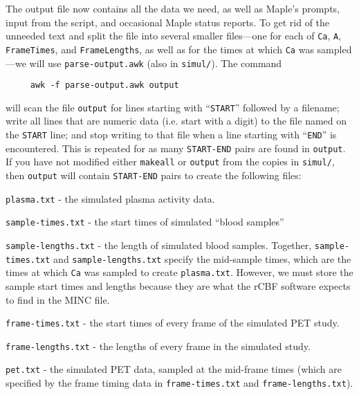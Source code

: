 The output file now contains all the data we need, as well as Maple's
prompts, input from the script, and occasional Maple status reports.
To get rid of the unneeded text and split the file into several
smaller files---one for each of \verb|Ca|, \verb|A|, \verb|FrameTimes|,
and \verb|FrameLengths|, as well as for the times at which \verb|Ca|
was sampled---we will use \verb|parse-output.awk| (also in
\verb|simul/|).  The command
\begin{verbatim}
     awk -f parse-output.awk output
\end{verbatim}
will scan the file \verb|output| for lines starting with
``\verb|START|'' followed by a filename; write all lines that are
numeric data (i.e. start with a digit) to the file named on the
\verb|START| line; and stop writing to that file when a line starting
with ``\verb|END|'' is encountered.  This is repeated for as many
\verb|START-END| pairs are found in \verb|output|.  If you have not
modified either \verb|makeall| or \verb|output| from the copies in
\verb|simul/|, then \verb|output| will contain
\verb|START-END| pairs to create the following files:
\begin{description}
\item \verb|plasma.txt| - the simulated plasma activity data.
\item \verb|sample-times.txt| - the start times of simulated ``blood samples''
\item \verb|sample-lengths.txt| - the length of simulated blood samples.  
Together, \verb|sample-times.txt| and \verb|sample-lengths.txt|
specify the mid-sample times, which are the times at which \verb|Ca|
was sampled to create \verb|plasma.txt|.  However, we must store the
sample start times and lengths because they are what the rCBF software
expects to find in the MINC file.
\item \verb|frame-times.txt| - the start times of every frame of the
simulated PET study.
\item \verb|frame-lengths.txt| - the lengths of every frame in the
simulated study.
\item \verb|pet.txt| - the simulated PET data, sampled at the
mid-frame times (which are specified by the frame timing data in
\verb|frame-times.txt| and \verb|frame-lengths.txt|).
\end{description}

